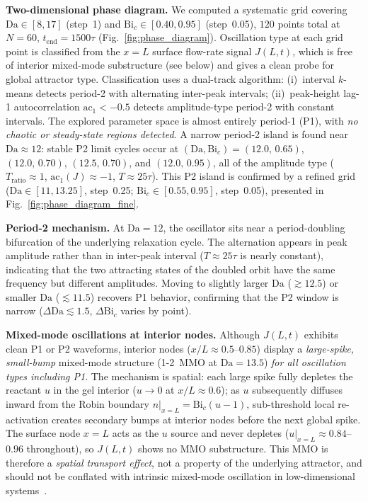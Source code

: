 \documentclass[aps,pre,reprint,superscriptaddress,longbibliography,floatfix]{revtex4-2}
\newcommand{\Da}{\mathrm{Da}}
\newcommand{\Bi}{\mathrm{Bi}}
\begin{document}
\textbf{Two-dimensional phase diagram.} We computed a systematic grid
covering $\Da\in[8,17]$ (step~1) and $\Bi_c\in[0.40,0.95]$ (step~0.05),
$120$ points total at $N=60$, $t_\mathrm{end}=1500\tau$
(Fig.~\ref{fig:phase_diagram}). Oscillation type at each grid point
is classified from the $x=L$ surface flow-rate signal $J(L,t)$, which
is free of interior mixed-mode substructure (see below) and gives a
clean probe for global attractor type. Classification uses a dual-track
algorithm: (i)~interval $k$-means detects period-2 with alternating
inter-peak intervals; (ii)~peak-height lag-1 autocorrelation $\mathrm{ac}_1 < -0.5$
detects amplitude-type period-2 with constant intervals. The explored
parameter space is almost entirely period-1 (P1), with \emph{no chaotic
or steady-state regions detected}. A narrow period-2 island is found
near $\Da\approx12$: stable P2 limit cycles occur at $(\Da,\Bi_c)=(12.0,\,0.65)$,
$(12.0,\,0.70)$, $(12.5,\,0.70)$, and $(12.0,\,0.95)$, all of the
amplitude type ($T_\mathrm{ratio}\approx1$, $\mathrm{ac}_1(J)\approx-1$,
$T\approx25\tau$). This P2 island is confirmed by a refined grid
($\Da\in[11,13.25]$, step~0.25; $\Bi_c\in[0.55,0.95]$, step~0.05),
presented in Fig.~\ref{fig:phase_diagram_fine}.

\textbf{Period-2 mechanism.} At $\Da=12$, the oscillator sits near a
period-doubling bifurcation of the underlying relaxation cycle. The
alternation appears in peak amplitude rather than in inter-peak interval
($T\approx25\tau$ is nearly constant), indicating that the two attracting
states of the doubled orbit have the same frequency but different
amplitudes. Moving to slightly larger $\Da$ ($\gtrsim12.5$) or smaller
$\Da$ ($\lesssim11.5$) recovers P1 behavior, confirming that the P2 window
is narrow ($\Delta\Da\lesssim1.5$, $\Delta\Bi_c$ varies by point).

\textbf{Mixed-mode oscillations at interior nodes.} Although $J(L,t)$
exhibits clean P1 or P2 waveforms, interior nodes ($x/L\approx0.5$--$0.85$)
display a \emph{large-spike, small-bump} mixed-mode structure (1-2~MMO
at $\Da=13.5$) \emph{for all oscillation types including P1}. The
mechanism is spatial: each large spike fully depletes the reactant $u$
in the gel interior ($u\to0$ at $x/L\approx0.6$); as $u$ subsequently
diffuses inward from the Robin boundary $n|_{x=L}=\Bi_c(u-1)$,
sub-threshold local re-activation creates secondary bumps at interior
nodes before the next global spike. The surface node $x=L$ acts as the
$u$ source and never depletes ($u|_{x=L}\approx0.84$--$0.96$ throughout),
so $J(L,t)$ shows no MMO substructure. This MMO is therefore a
\emph{spatial transport effect}, not a property of the underlying
attractor, and should not be conflated with intrinsic mixed-mode
oscillation in low-dimensional systems~\cite{Desroches2012}.
\end{document}
